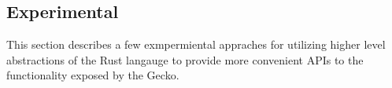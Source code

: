 \subsection{Experimental}

This section describes a few exmpermiental appraches for utilizing higher level abstractions of the Rust langauge to provide more convenient APIs to the functionality exposed by the Gecko.



